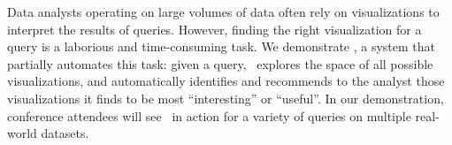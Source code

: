 

% 
Data analysts operating on large volumes of data 
often rely on visualizations to interpret the results of queries. 
However, finding the right visualization for a query is 
a laborious and time-consuming task. 
We demonstrate \VizRecDB, a system that partially automates 
this task: 
given a query, \VizRecDB\ explores the space of all possible visualizations,
and automatically identifies and recommends to the analyst those visualizations
it finds to be most ``interesting'' or ``useful''.
In our demonstration, conference attendees
will see \VizRecDB\ in action for a variety of queries on multiple real-world
datasets.




